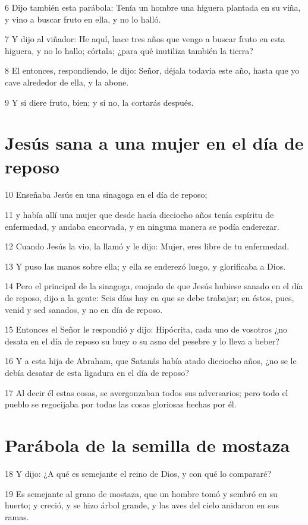 \par 6 Dijo también esta parábola: Tenía un hombre una higuera plantada en su viña, y vino a buscar fruto en ella, y no lo halló.
\par 7 Y dijo al viñador: He aquí, hace tres años que vengo a buscar fruto en esta higuera, y no lo hallo; córtala; ¿para qué inutiliza también la tierra?
\par 8 El entonces, respondiendo, le dijo: Señor, déjala todavía este año, hasta que yo cave alrededor de ella, y la abone.
\par 9 Y si diere fruto, bien; y si no, la cortarás después.

\section*{Jesús sana a una mujer en el día de reposo}

\par 10 Enseñaba Jesús en una sinagoga en el día de reposo;
\par 11 y había allí una mujer que desde hacía dieciocho años tenía espíritu de enfermedad, y andaba encorvada, y en ninguna manera se podía enderezar.
\par 12 Cuando Jesús la vio, la llamó y le dijo: Mujer, eres libre de tu enfermedad.
\par 13 Y puso las manos sobre ella; y ella se enderezó luego, y glorificaba a Dios.
\par 14 Pero el principal de la sinagoga, enojado de que Jesús hubiese sanado en el día de reposo, dijo a la gente: Seis días hay en que se debe trabajar; en éstos, pues, venid y sed sanados, y no en día de reposo.
\par 15 Entonces el Señor le respondió y dijo: Hipócrita, cada uno de vosotros ¿no desata en el día de reposo su buey o su asno del pesebre y lo lleva a beber?
\par 16 Y a esta hija de Abraham, que Satanás había atado dieciocho años, ¿no se le debía desatar de esta ligadura en el día de reposo?
\par 17 Al decir él estas cosas, se avergonzaban todos sus adversarios; pero todo el pueblo se regocijaba por todas las cosas gloriosas hechas por él.

\section*{Parábola de la semilla de mostaza}

\par 18 Y dijo: ¿A qué es semejante el reino de Dios, y con qué lo compararé?
\par 19 Es semejante al grano de mostaza, que un hombre tomó y sembró en su huerto; y creció, y se hizo árbol grande, y las aves del cielo anidaron en sus ramas.

